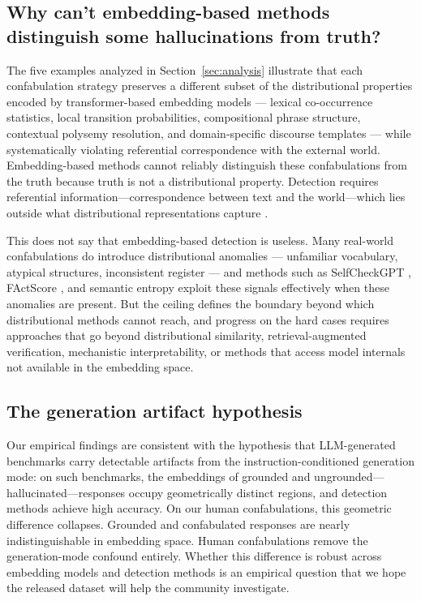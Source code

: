 \documentclass[11pt]{article}
\begin{document}
\subsection{Why can't embedding-based methods distinguish some hallucinations from truth?}
The five examples analyzed in Section~\ref{sec:analysis} illustrate that each confabulation strategy preserves a different subset of the distributional properties encoded by transformer-based embedding models — lexical co-occurrence statistics, local transition probabilities, compositional phrase structure, contextual polysemy resolution, and domain-specific discourse templates — while systematically violating referential correspondence with the external world. Embedding-based methods cannot reliably distinguish these confabulations from the truth because truth is not a distributional property. Detection requires referential information---correspondence between text and the world---which lies outside what distributional representations capture \citep{harris1954distributional, bender2020climbing}.


This does not say that embedding-based detection is useless. Many real-world confabulations do introduce distributional anomalies — unfamiliar vocabulary, atypical structures, inconsistent register — and methods such as SelfCheckGPT \citep{manakul2023selfcheckgpt}, FActScore \citep{min2023factscore}, and semantic entropy \citep{farquhar2024detecting} exploit these signals effectively when these anomalies are present. But the ceiling defines the boundary beyond which distributional methods cannot reach, and progress on the hard cases requires approaches that go beyond distributional similarity, retrieval-augmented verification, mechanistic interpretability, or methods that access model internals not available in the embedding space.

\subsection{The generation artifact hypothesis}
Our empirical findings are consistent with the hypothesis that LLM-generated benchmarks carry detectable artifacts from the instruction-conditioned generation mode: on such benchmarks, the embeddings of grounded and ungrounded---hallucinated---responses occupy geometrically distinct regions, and detection methods achieve high accuracy. On our human confabulations, this geometric difference collapses. Grounded and confabulated responses are nearly indistinguishable in embedding space. Human confabulations remove the generation-mode confound entirely. Whether this difference is robust across embedding models and detection methods is an empirical question that we hope the released dataset will help the community investigate.
\end{document}
